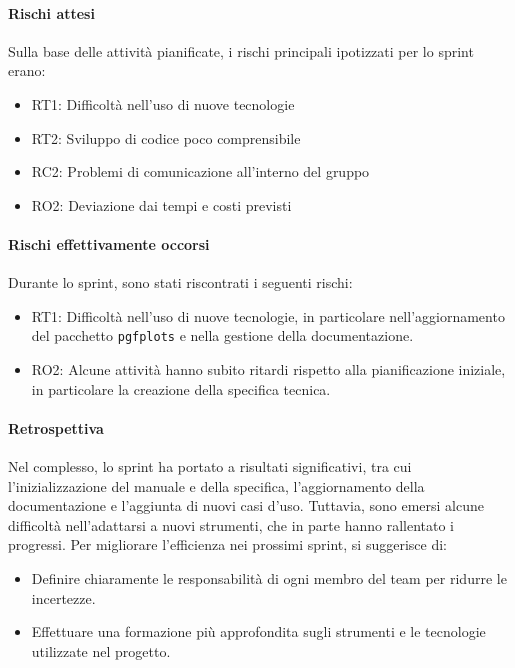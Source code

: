 \documentclass{article}
\begin{document}
            \paragraph{Rischi attesi}
            Sulla base delle attività pianificate, i rischi principali ipotizzati per lo sprint erano:
            \begin{itemize}
                \item RT1: Difficoltà nell’uso di nuove tecnologie
                \item RT2: Sviluppo di codice poco comprensibile
                \item RC2: Problemi di comunicazione all’interno del gruppo
                \item RO2: Deviazione dai tempi e costi previsti
            \end{itemize}
            
            \paragraph{Rischi effettivamente occorsi}
            Durante lo sprint, sono stati riscontrati i seguenti rischi:
            \begin{itemize}
                \item RT1: Difficoltà nell’uso di nuove tecnologie, in particolare nell'aggiornamento del pacchetto \texttt{pgfplots} e nella gestione della documentazione.
                \item RO2: Alcune attività hanno subito ritardi rispetto alla pianificazione iniziale, in particolare la creazione della specifica tecnica.
            \end{itemize}
            
            \paragraph{Retrospettiva}
            Nel complesso, lo sprint ha portato a risultati significativi, tra cui l'inizializzazione del manuale e della specifica, l'aggiornamento della documentazione e l'aggiunta di nuovi casi d'uso. Tuttavia, sono emersi alcune difficoltà nell'adattarsi a nuovi strumenti, che in parte hanno rallentato i progressi. Per migliorare l'efficienza nei prossimi sprint, si suggerisce di:
            \begin{itemize}
                \item Definire chiaramente le responsabilità di ogni membro del team per ridurre le incertezze.
                \item Effettuare una formazione più approfondita sugli strumenti e le tecnologie utilizzate nel progetto.
            \end{itemize}
                
\end{document}

